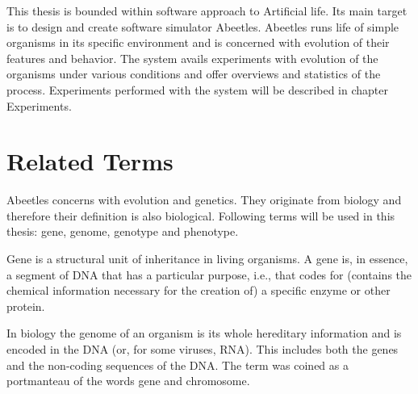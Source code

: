 \documentclass[a4paper,12pt]{report}
\begin{document}
This thesis is bounded within software approach to Artificial life. Its main target is to design and create software simulator Abeetles. Abeetles runs life of simple organisms in its specific environment and is concerned with evolution of their features and behavior. The system avails experiments with evolution of the organisms under various conditions and offer overviews and statistics of the process. Experiments performed with the system will be described in chapter Experiments.






\section{Related Terms}
Abeetles concerns with evolution and genetics. They originate from biology and therefore their definition is also biological. Following terms will be used in this thesis: gene, genome, genotype and phenotype.

Gene is a structural unit of inheritance in living organisms. A gene is, in essence, a segment of DNA that has a particular purpose, i.e., that codes for (contains the chemical information necessary for the creation of) a specific enzyme or other protein.\cite{GeneDic}

In biology the genome of an organism is its whole hereditary information and is encoded in the DNA (or, for some viruses, RNA). This includes both the genes and the non-coding sequences of the DNA. The term was coined as a portmanteau of the words gene and chromosome.\cite{GenomeDef}
\end{document}
